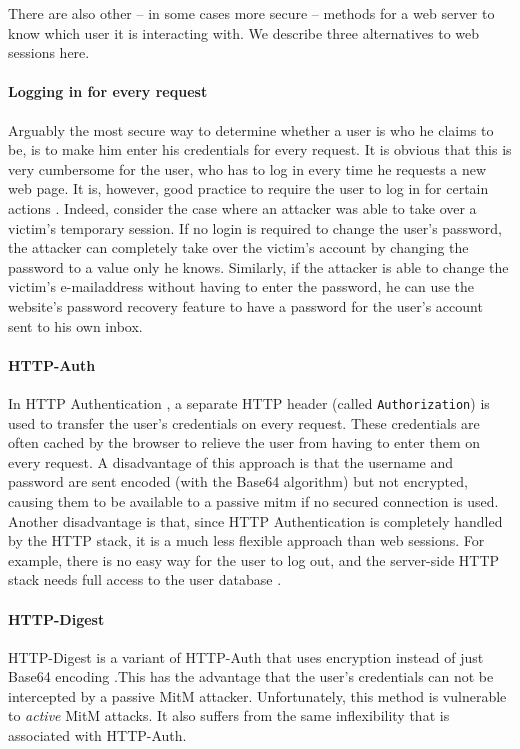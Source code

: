 There are also other -- in some cases more secure -- methods for a web server to know which user it is interacting with. We describe three alternatives to web sessions here.

\paragraph{Logging in for every request}
Arguably the most secure way to determine whether a user is who he claims to be, is to make him enter his credentials for every request. It is obvious that this is very cumbersome for the user, who has to log in every time he requests a new web page. It is, however, good practice to require the user to log in for certain actions \cite{Webers2008}. Indeed, consider the case where an attacker was able to take over a victim's temporary session. If no login is required to change the user's password, the attacker can completely take over the victim's account by changing the password to a value only he knows. Similarly, if the attacker is able to change the victim's e-mailaddress without having to enter the password, he can use the website's password recovery feature to have a password for the user's account sent to his own inbox.

\paragraph{HTTP-Auth}
In HTTP Authentication \cite{rfc2617}, a separate HTTP header (called \texttt{Authorization}) is used to transfer the user's credentials on every request. These credentials are often cached by the browser to relieve the user from having to enter them on every request. A disadvantage of this approach is that the username and password are sent encoded (with the Base64 algorithm) but not encrypted, causing them to be available to a passive \gls{mitm} if no secured connection is used. Another disadvantage is that, since HTTP Authentication is completely handled by the HTTP stack, it is a much less flexible approach than web sessions. For example, there is no easy way for the user to log out, and the server-side HTTP stack needs full access to the user database \cite{Adida2008}.

\paragraph{HTTP-Digest}
HTTP-Digest is a variant of HTTP-Auth that uses encryption instead of just Base64 encoding \cite{rfc2617}.This has the advantage that the user's credentials can not be intercepted by a passive MitM attacker. Unfortunately, this method is vulnerable to \emph{active} MitM attacks. It also suffers from the same inflexibility that is associated with HTTP-Auth.

